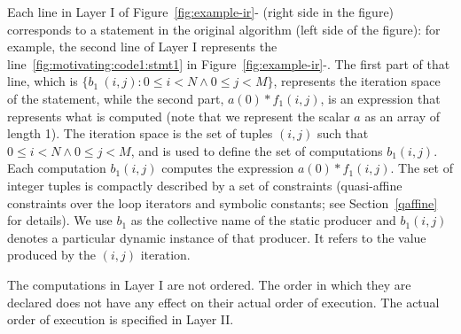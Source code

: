 Each line in Layer I of Figure~\ref{fig:example-ir}-\codeone{} (right side in the figure) corresponds to a statement in the original algorithm (left side of the figure): for example, the second line of Layer I represents the line~\ref{fig:motivating:code1:stmt1} in Figure~\ref{fig:example-ir}-\codeone{}.
The first part of that line, which is $\{b_1\ (i, j): 0\leq i < N \wedge 0\leq j < M\}$, represents the iteration space of the statement, while the second part, $a(0)*f_1(i, j)$, is an expression that represents what is computed (note that we represent the scalar $a$ as an array of length 1).
The iteration space is the set of tuples $(i,j)$ such that $0\leq i < N \wedge 0\leq j < M$, and is used to define the set of computations $b_1(i,j)$.  Each computation $b_1(i,j)$ computes the expression $a(0)*f_1(i,j)$.  The set of integer tuples is compactly described by a set of constraints (quasi-affine constraints over the loop iterators and symbolic constants; see Section~\ref{qaffine} for details).  We use $b_1$ as the collective name of the static producer and $b_1(i,j)$ denotes a particular dynamic instance of that producer.  It refers to the value produced by the $(i,j)$ iteration.


The computations in Layer I are not ordered.  The order in which they are declared does not have any effect on their actual order of execution.  The actual order of execution is specified in Layer II.





